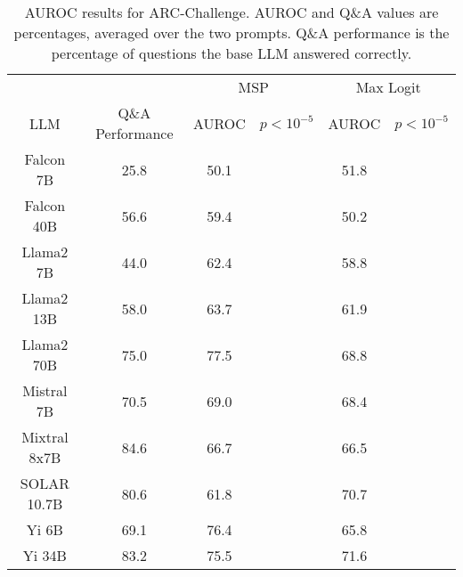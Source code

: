 \begin{table*}
\centering
\begin{tabular}{c|c|c|c|c|c}
& & \multicolumn{2}{c|}{MSP} & \multicolumn{2}{c}{Max Logit} \\ 
LLM & Q\&A Performance & AUROC & $p < 10^{-5}$ & AUROC & $p < 10^{-5}$\\ \hline
Falcon 7B & 25.8 & 50.1 &  & 51.8 & \\
Falcon 40B & 56.6 & 59.4 &  & 50.2 & \\
Llama2 7B & 44.0 & 62.4 &  & 58.8 & \\
Llama2 13B & 58.0 & 63.7 &  & 61.9 & \\
Llama2 70B & 75.0 & 77.5 &  & 68.8 & \\
Mistral 7B & 70.5 & 69.0 &  & 68.4 & \\
Mixtral 8x7B & 84.6 & 66.7 &  & 66.5 & \\
SOLAR 10.7B & 80.6 & 61.8 &  & 70.7 & \\
Yi 6B & 69.1 & 76.4 &  & 65.8 & \\
Yi 34B & 83.2 & 75.5 &  & 71.6 & \\
\hline
\end{tabular}
\caption{AUROC results for ARC-Challenge. AUROC and Q\&A values are percentages, averaged over the two prompts. Q\&A performance is the percentage of questions the base LLM answered correctly.}
\label{tab:arc_auroc}
\end{table*}
